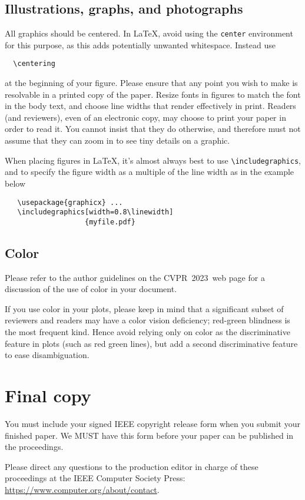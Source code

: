 \documentclass[10pt,twocolumn,letterpaper]{article}
\def\confName{CVPR}
\def\confYear{2023}
\begin{document}
\subsection{Illustrations, graphs, and photographs}

All graphics should be centered.
In \LaTeX, avoid using the \texttt{center} environment for this purpose, as this adds potentially unwanted whitespace.
Instead use
{\small\begin{verbatim}
  \centering
\end{verbatim}}
at the beginning of your figure.
Please ensure that any point you wish to make is resolvable in a printed copy of the paper.
Resize fonts in figures to match the font in the body text, and choose line widths that render effectively in print.
Readers (and reviewers), even of an electronic copy, may choose to print your paper in order to read it.
You cannot insist that they do otherwise, and therefore must not assume that they can zoom in to see tiny details on a graphic.

When placing figures in \LaTeX, it's almost always best to use \verb+\includegraphics+, and to specify the figure width as a multiple of the line width as in the example below
{\small\begin{verbatim}
   \usepackage{graphicx} ...
   \includegraphics[width=0.8\linewidth]
                   {myfile.pdf}
\end{verbatim}
}


\subsection{Color}

Please refer to the author guidelines on the \confName\ \confYear\ web page for a discussion of the use of color in your document.

If you use color in your plots, please keep in mind that a significant subset of reviewers and readers may have a color vision deficiency; red-green blindness is the most frequent kind.
Hence avoid relying only on color as the discriminative feature in plots (such as red \vs green lines), but add a second discriminative feature to ease disambiguation.

\section{Final copy}

You must include your signed IEEE copyright release form when you submit your finished paper.
We MUST have this form before your paper can be published in the proceedings.

Please direct any questions to the production editor in charge of these proceedings at the IEEE Computer Society Press:
\url{https://www.computer.org/about/contact}.


{\small


}
\end{document}
